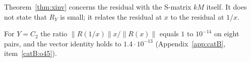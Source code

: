 \begin{remark}
Theorem~\ref{thm:xinv} concerns the residual with the S-matrix $kM$ itself. It does not state that $R_Y$ is small; it relates the residual at $x$ to the residual at $1/x$.
\end{remark}
\begin{catbremark}
For $Y=C_2$ the ratio $\|R(1/x)\|x/\|R(x)\|$ equals $1$ to $10^{-14}$ on eight pairs, and the vector identity holds to $1.4\cdot10^{-13}$
(Appendix~\ref{app:catB}, item~\ref{catB:o45}).
\end{catbremark}
